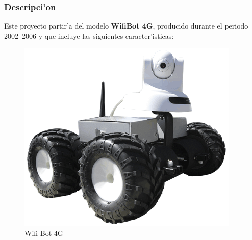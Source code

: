 \documentclass[twoside]{article}
\begin{document}
\subsubsection{Descripci'on}
Este proyecto partir'a del modelo \textbf{WifiBot 4G}, producido durante el periodo 2002--2006 y que incluye las siguientes caracter'isticas:

\begin{figure}[ht]
\centering
\includegraphics[scale=0.5]{images/Visuel_Wifibot_2.png} 
\caption{Wifi Bot 4G}
\label{fig:Wifi Bot 4G}
\end{figure}
\end{document}
